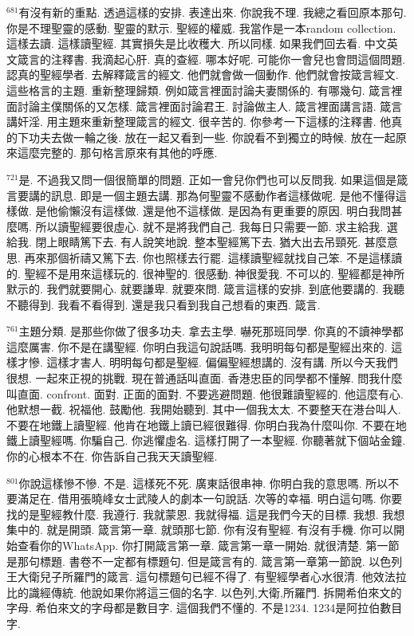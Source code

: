 \documentclass{book}
\begin{document}
$^{681}$有沒有新的重點.
透過這樣的安排.
表達出來.
你說我不理.
我總之看回原本那句.
你是不理聖靈的感動.
聖靈的默示.
聖經的權威.
我當作是一本random collection.
這樣去讀.
這樣讀聖經.
其實損失是比收穫大.
所以同樣.
如果我們回去看.
中文英文箴言的注釋書.
我滴起心肝.
真的查經.
哪本好呢.
可能你一會兒也會問這個問題.
認真的聖經學者.
去解釋箴言的經文.
他們就會做一個動作.
他們就會按箴言經文.
這些格言的主題.
重新整理歸類.
例如箴言裡面討論夫妻關係的.
有哪幾句.
箴言裡面討論主僕關係的又怎樣.
箴言裡面討論君王.
討論做主人.
箴言裡面講言語.
箴言講奸淫.
用主題來重新整理箴言的經文.
很辛苦的.
你參考一下這樣的注釋書.
他真的下功夫去做一輪之後.
放在一起又看到一些.
你說看不到獨立的時候.
放在一起原來這麼完整的.
那句格言原來有其他的呼應.

$^{721}$是.
不過我又問一個很簡單的問題.
正如一會兒你們也可以反問我.
如果這個是箴言要講的訊息.
即是一個主題去講.
那為何聖靈不感動作者這樣做呢.
是他不懂得這樣做.
是他偷懶沒有這樣做.
還是他不這樣做.
是因為有更重要的原因.
明白我問甚麼嗎.
所以讀聖經要很虛心.
就不是將我們自己.
我每日只需要一節.
求主給我.
選給我.
閉上眼睛篤下去.
有人說笑地說.
整本聖經篤下去.
猶大出去吊頸死.
甚麼意思.
再來那個祈禱又篤下去.
你也照樣去行罷.
這樣讀聖經就找自己笨.
不是這樣讀的.
聖經不是用來這樣玩的.
很神聖的.
很感動.
神很愛我.
不可以的.
聖經都是神所默示的.
我們就要開心.
就要謙卑.
就要來問.
箴言這樣的安排.
到底他要講的.
我聽不聽得到.
我看不看得到.
還是我只看到我自己想看的東西.
箴言.

$^{761}$主題分類.
是那些你做了很多功夫.
拿去主學.
嚇死那班同學.
你真的不讀神學都這麼厲害.
你不是在講聖經.
你明白我這句說話嗎.
我明明每句都是聖經出來的.
這樣才慘.
這樣才害人.
明明每句都是聖經.
偏偏聖經想講的.
沒有講.
所以今天我們很想.
一起來正視的挑戰.
現在普通話叫直面.
香港忠臣的同學都不懂解.
問我什麼叫直面.
confront.
面對.
正面的面對.
不要逃避問題.
他很難讀聖經的.
他這麼有心.
他默想一截.
祝福他.
鼓勵他.
我開始聽到.
其中一個我太太.
不要整天在港台叫人.
不要在地鐵上讀聖經.
他肯在地鐵上讀已經很難得.
你明白我為什麼叫你.
不要在地鐵上讀聖經嗎.
你騙自己.
你逃懼虛名.
這樣打開了一本聖經.
你聽著就下個站金鐘.
你的心根本不在.
你告訴自己我天天讀聖經.

$^{801}$你說這樣慘不慘.
不是.
這樣死不死.
廣東話很串神.
你明白我的意思嗎.
所以不要滿足在.
借用張曉峰女士武陵人的劇本一句說話.
次等的幸福.
明白這句嗎.
你要找的是聖經教什麼.
我遵行.
我就蒙恩.
我就得福.
這是我們今天的目標.
我想.
我想集中的.
就是開頭.
箴言第一章.
就頭那七節.
你有沒有聖經.
有沒有手機.
你可以開始查看你的WhatsApp.
你打開箴言第一章.
箴言第一章一開始.
就很清楚.
第一節是那句標題.
書卷不一定都有標題句.
但是箴言有的.
箴言第一章第一節說.
以色列王大衛兒子所羅門的箴言.
這句標題句已經不得了.
有聖經學者心水很清.
他效法拉比的識經傳統.
他說如果你將這三個的名字.
以色列,大衛,所羅門.
拆開希伯來文的字母.
希伯來文的字母都是數目字.
這個我們不懂的.
不是1234.
1234是阿拉伯數目字.
\end{document}
